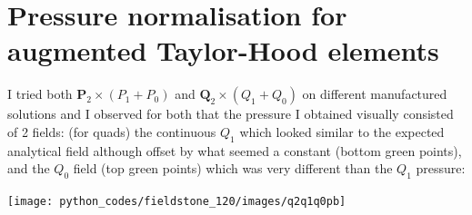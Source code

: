 \begin{multicols}{2}


\begin{tiny}

\end{tiny}
\end{multicols}

%

%

\begin{multicols}{2}


\begin{tiny}

\end{tiny}
\end{multicols}










\newpage
\section*{Pressure normalisation for augmented Taylor-Hood elements}


I tried both ${\bm P}_2\times (P_1+P_0)$ and ${\bm Q}_2\times (Q_1+Q_0)$ on different manufactured solutions 
and I observed for both that the pressure I obtained visually consisted of 2 fields: (for quads) 
the continuous $Q_1$ which looked similar to the expected analytical field although offset by what 
seemed a constant (bottom green points), and the $Q_0$ field (top green points) which was 
very different than the $Q_1$ pressure:

\begin{center}
\texttt{[image: python\_codes/fieldstone\_120/images/q2q1q0pb]}
\end{center}

